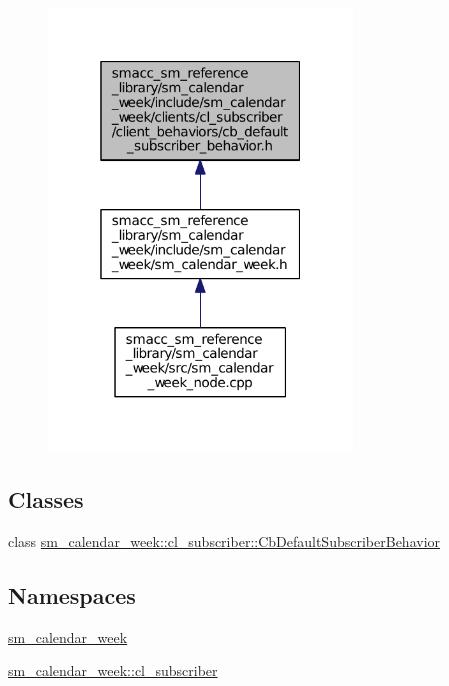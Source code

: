 \begin{figure}[H]
\begin{center}
\leavevmode
\includegraphics[width=229pt]{sm__calendar__week_2include_2sm__calendar__week_2clients_2cl__subscriber_2client__behaviors_2cb_3b0a45a53674a546af37b1b6c81cd353}
\end{center}
\end{figure}
\subsection*{Classes}
\begin{DoxyCompactItemize}
\item 
class \hyperlink{classsm__calendar__week_1_1cl__subscriber_1_1CbDefaultSubscriberBehavior}{sm\+\_\+calendar\+\_\+week\+::cl\+\_\+subscriber\+::\+Cb\+Default\+Subscriber\+Behavior}
\end{DoxyCompactItemize}
\subsection*{Namespaces}
\begin{DoxyCompactItemize}
\item 
 \hyperlink{namespacesm__calendar__week}{sm\+\_\+calendar\+\_\+week}
\item 
 \hyperlink{namespacesm__calendar__week_1_1cl__subscriber}{sm\+\_\+calendar\+\_\+week\+::cl\+\_\+subscriber}
\end{DoxyCompactItemize}
